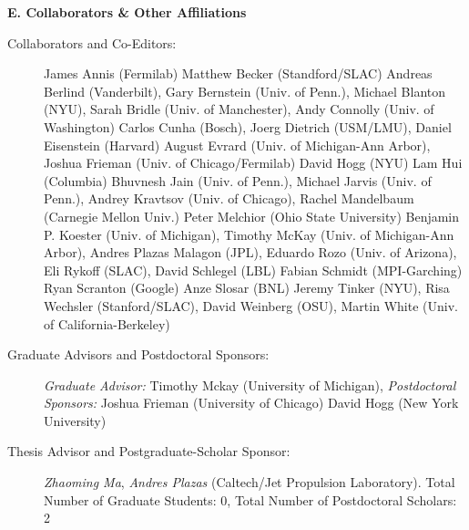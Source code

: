 \documentclass[10pt]{article}
\begin{document}
{\large \bf E. Collaborators \& Other Affiliations}
\begin{description}
\item[Collaborators and Co-Editors:]

    James Annis (Fermilab)
    Matthew Becker (Standford/SLAC)
    Andreas Berlind (Vanderbilt),
    Gary Bernstein (Univ. of Penn.),
    Michael Blanton (NYU),
    Sarah Bridle (Univ. of Manchester),
    Andy Connolly (Univ. of Washington)
    Carlos Cunha (Bosch), 
    Joerg Dietrich (USM/LMU),
    Daniel Eisenstein (Harvard)
    August Evrard (Univ. of Michigan-Ann Arbor), 
    Joshua Frieman (Univ. of Chicago/Fermilab)
    David Hogg (NYU)
    Lam Hui (Columbia)
    Bhuvnesh Jain (Univ. of Penn.),
    Michael Jarvis (Univ. of Penn.),
    Andrey Kravtsov (Univ. of Chicago),
    Rachel Mandelbaum (Carnegie Mellon Univ.)
    Peter Melchior (Ohio State University)
    Benjamin P. Koester (Univ. of Michigan),
    Timothy McKay (Univ. of Michigan-Ann Arbor), 
    Andres Plazas Malagon (JPL),
    Eduardo Rozo (Univ. of Arizona), 
    Eli Rykoff (SLAC),
    David Schlegel (LBL)
    Fabian Schmidt (MPI-Garching)
    Ryan Scranton (Google)
    Anze Slosar (BNL)
    Jeremy Tinker (NYU),
    Risa Wechsler (Stanford/SLAC),
    David Weinberg (OSU),
    Martin White (Univ. of California-Berkeley)

\item[Graduate Advisors and Postdoctoral Sponsors:] \textit{Graduate Advisor:}
    Timothy Mckay (University of Michigan),
    \textit{Postdoctoral Sponsors:} Joshua Frieman (University of Chicago)
    David Hogg (New York University)

\item[Thesis Advisor and Postgraduate-Scholar Sponsor:] \textit{Zhaoming Ma},
    \textit{Andres Plazas} (Caltech/Jet Propulsion Laboratory).
    Total Number of Graduate Students: 0, Total Number of Postdoctoral
    Scholars: 2

\end{description}

\end{document}
